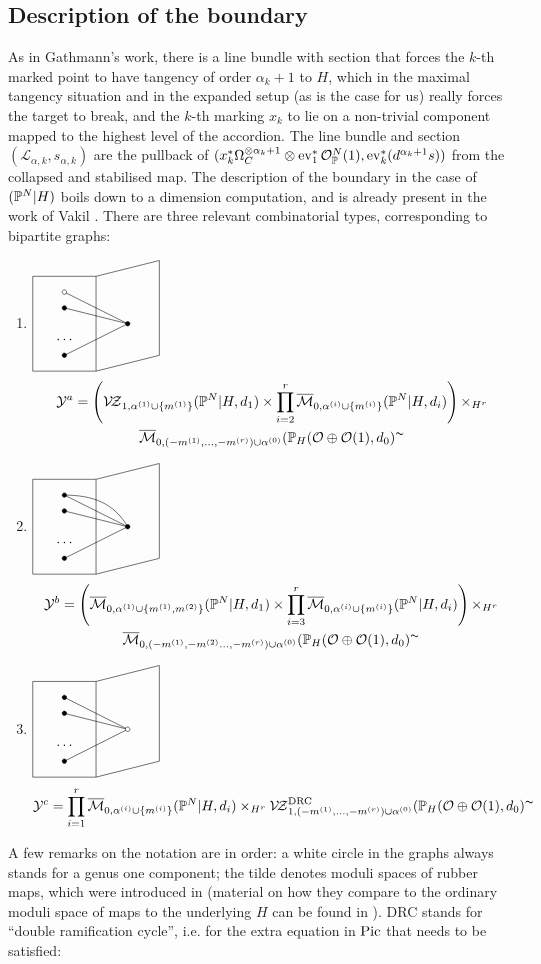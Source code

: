 \subsection{Description of the boundary} As in Gathmann's work, there is a line bundle with section that forces the $k$-th marked point to have tangency of order $\alpha_k+1$ to $H$, which in the maximal tangency situation and in the expanded setup (as is the case for us) really forces the target to break, and the $k$-th marking $x_k$ to lie on a non-trivial component mapped to the highest level of the accordion. The line bundle and section $(\mathcal L_{\alpha,k},s_{\alpha,k})$ are the pullback of $(x_k^*\Omega_{C}^{\otimes \alpha_k+1}\otimes\operatorname{ev}_1^*\mathcal{O}_\mathbb P^N(1),\operatorname{ev}_k^*(d^{\alpha_k+1}s))$ from the collapsed and stabilised map. The description of the boundary in the case of $(\mathbb P^N|H)$ boils down to a dimension computation, and is already present in the work of Vakil \cite{Vre}. There are three relevant combinatorial types, corresponding to bipartite graphs:
\begin{enumerate}[label=(\alph*)]
 \item $\Yagraph$ \begin{multline*}\mathcal Y^a=\left(\mathcal{V\!Z}_{1,\alpha^{(1)}\cup\{m^{(1)}\}}(\mathbb P^N|H,d_1)\times\prod_{i=2}^r\overline{\mathcal{M}}_{0,\alpha^{(i)}\cup\{m^{(i)}\}}(\mathbb P^N|H,d_i)\right)\times_{H^r} \\ \overline{\mathcal{M}}_{0,(-m^{(1)},\ldots,-m^{(r)})\cup\alpha^{(0)}}(\mathbb P_H(\mathcal{O}\oplus\mathcal{O}(1),d_0)^\thicksim\end{multline*}
 \item $\Ybgraph$ \begin{multline*}\mathcal Y^b=\left(\overline{\mathcal{M}}_{0,\alpha^{(1)}\cup\{m^{(1)},m^{(2)}\}}(\mathbb P^N|H,d_1)\times\prod_{i=3}^r\overline{\mathcal{M}}_{0,\alpha^{(i)}\cup\{m^{(i)}\}}(\mathbb P^N|H,d_i)\right)\times_{H^r}\\ \overline{\mathcal{M}}_{0,(-m^{(1)},-m^{(2)}\ldots,-m^{(r)})\cup\alpha^{(0)}}(\mathbb P_H(\mathcal{O}\oplus\mathcal{O}(1),d_0)^\thicksim\end{multline*}
 \item $\Ycgraph$\begin{multline*}\mathcal Y^c= \prod_{i=1}^r\overline{\mathcal{M}}_{0,\alpha^{(i)}\cup\{m^{(i)}\}}(\mathbb P^N|H,d_i)\times_{H^r}\mathcal{V\!Z}^{\rm{DRC}}_{1,(-m^{(1)},\ldots,-m^{(r)})\cup\alpha^{(0)}}(\mathbb P_H(\mathcal{O}\oplus\mathcal{O}(1),d_0)^\thicksim\end{multline*}
\end{enumerate}
A few remarks on the notation are in order: a white circle in the graphs always stands for a genus one component; the tilde denotes moduli spaces of rubber maps, which were introduced in \cite{GraberVakil} (material on how they compare to the ordinary moduli space of maps to the underlying $H$ can be found in \cite[Chapter 5]{GathmannThesis}). DRC stands for ``double ramification cycle'', i.e. for the extra equation in $\operatorname{Pic}$ that needs to be satisfied:
